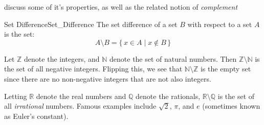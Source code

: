         discuss some of it's properties, as well as the related notion of
        \textit{complement}
        \begin{fdefinition}{Set Difference}{Set_Difference}
            The set difference of a set $B$ with respect to a set $A$ is the
            set:
            \begin{equation*}
                A\setminus{B}=\{\,x\in{A}\;|\;x\notin{B}\,\}
            \end{equation*}
        \end{fdefinition}
        \begin{example}
            Let $\mathbb{Z}$ denote the integers, and $\mathbb{N}$ denote the
            set of natural numbers. Then $\mathbb{Z}\setminus\mathbb{N}$ is the
            set of all negative integers. Flipping this, we see that
            $\mathbb{N}\setminus\mathbb{Z}$ is the empty set since there are no
            non-negative integers that are not also integers.
        \end{example}
        \begin{example}
            Letting $\mathbb{R}$ denote the real numbers and $\mathbb{Q}$ denote
            the rationals, $\mathbb{R}\setminus\mathbb{Q}$ is the set of all
            \textit{irrational} numbers. Famous examples include $\sqrt{2}$,
            $\pi$, and $e$ (sometimes known as Euler's constant).
        \end{example}
